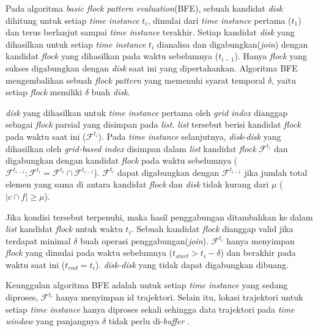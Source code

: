 \par Pada algoritma \textit{basic flock pattern evaluation}(BFE), sebuah kandidat \textit{disk} dihitung untuk setiap \textit{time instance} $t_i$, dimulai dari \textit{time instance} pertama ($t_1$) dan terus berlanjut sampai \textit{time instance} terakhir. Setiap kandidat \textit{disk} yang dihasilkan untuk setiap \textit{time instance} $t_i$ dianalisa dan digabungkan(\textit{join}) dengan kandidat \textit{flock} yang dihasilkan pada waktu sebelumnya ($t_{i-1}$). Hanya \textit{flock} yang sukses digabungkan dengan \textit{disk} saat ini yang dipertahankan. Algoritma BFE mengembalikan sebuah \textit{flock pattern} yang memenuhi syarat temporal $\delta$, yaitu setiap \textit{flock} memiliki $\delta$ buah \textit{disk}.

\par \textit{disk} yang dihasilkan untuk \textit{time instance} pertama oleh \textit{grid index} dianggap sebagai \textit{flock} parsial yang disimpan pada \textit{list}. \textit{list} tersebut berisi kandidat \textit{flock} pada waktu saat ini ($\mathcal{F}^{t_i}$). Pada \textit{time instance} selanjutnya, \textit{disk}-\textit{disk} yang dihasilkan oleh \textit{grid-based index} disimpan dalam \textit{list} kandidat \textit{flock} $\mathcal{F}^{t_i}$ dan digabungkan dengan kandidat \textit{flock} pada waktu sebelumnya ($\mathcal{F}^{t_{i-1}};\mathcal{F}^{t_i}=\mathcal{F}^{t_i}\cap\mathcal{F}^{t_{i-1}}$). $\mathcal{F}^{t_i}$ dapat digabungkan dengan $\mathcal{F}^{t_{i-1}}$ jika jumlah total elemen yang sama di antara kandidat \textit{flock} dan \textit{disk} tidak kurang dari $\mu$ ($|c\cap f|\geq\mu$).

\par Jika kondisi tersebut terpenuhi, maka hasil penggabungan ditambahkan ke dalam \textit{list} kandidat \textit{flock} untuk waktu $t_i$. Sebuah kandidat \textit{flock} dianggap valid jika terdapat minimal $\delta$ buah operasi penggabungan(\textit{join}). $\mathcal{F}^{t_i}$ hanya menyimpan \textit{flock} yang dimulai pada waktu sebelumnya ($t_{start}>t_i-\delta$) dan berakhir pada waktu saat ini ($t_{end}=t_i$). \textit{disk-disk} yang tidak dapat digabungkan dibuang.

\par Keunggulan algoritma BFE adalah untuk setiap \textit{time instance} yang sedang diproses, $\mathcal{F}^{t_i}$ hanya menyimpan id trajektori. Selain itu, lokasi trajektori untuk setiap \textit{time instance} hanya diproses sekali sehingga data trajektori pada \textit{time window} yang panjangnya $\delta$ tidak perlu di-\textit{buffer} \cite{flock_pattern_discovery_2:09}.

